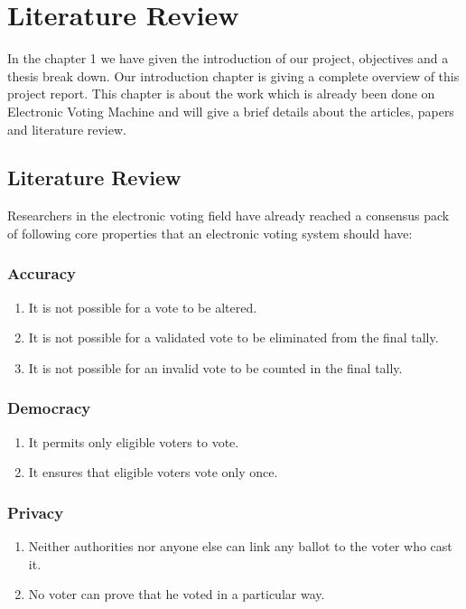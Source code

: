 \chapter{Literature Review}
\label{chap2}

In the chapter 1 we have given the introduction of our project, objectives and a thesis break down. Our introduction chapter is giving a complete overview of this project report. This chapter is about the work which is already been done on Electronic Voting Machine and will give a brief details about the articles, papers and literature review.

\section{Literature Review}
Researchers in the electronic voting field have already reached a consensus pack of following core properties that an electronic voting system
should have\cite{kumar2012electronic}:
\subsection{Accuracy}
\begin{enumerate}
\item It is not possible for a vote to be altered.
%
\item It is not possible for a validated vote to be eliminated from the final tally.
%
\item It is not possible for an invalid vote to be counted in the final tally.
%
%
\end{enumerate}
\subsection{Democracy}
\begin{enumerate}
\item It permits only eligible voters to vote.
%
\item It ensures that eligible voters vote only once.
%
\end{enumerate}
\subsection{Privacy}
\begin{enumerate}
\item Neither authorities nor anyone else can link any ballot to the voter who cast it.
%
\item No voter can prove that he voted in a particular way.
%
\end{enumerate}
